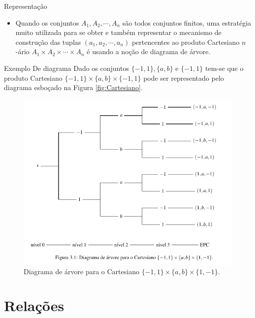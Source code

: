\documentclass[aspectratio=169]{beamer}
\begin{document}
	\begin{frame}{Representação}
		\begin{itemize}
			\item Quando os conjuntos $A_1, A_2, \cdots, A_n$ são todos conjuntos finitos, uma estratégia muito utilizada para se obter e também representar o mecanismo de construção das tuplas $(a_1, a_2, \cdots, a_n)$ pertencentes ao produto Cartesiano $n$-ário $A_1 \times A_2 \times \cdots \times A_n$ é usando a noção de diagrama de árvore.
		\end{itemize}
	\end{frame}

	\begin{frame}{Exemplo De diagrama}
		Dado os conjuntos $\{-1, 1\}, \{a, b\}$ e $\{-1, 1\}$ tem-se que o produto Cartesiano $\{-1, 1\} \times \{a, b\} \times \{-1, 1\}$ pode ser representado pelo diagrama esboçado na Figura \ref{fig:Cartesiano}.

		\begin{figure}[h]
			\includegraphics[scale=0.25]{imagem}
			\caption{Diagrama de árvore para o Cartesiano $\{-1, 1\} \times \{a, b\} \times \{1, -1\}$.}
			\label{fig:imagem}
		\end{figure}
	\end{frame}

	\section{Relações}
\end{document}
